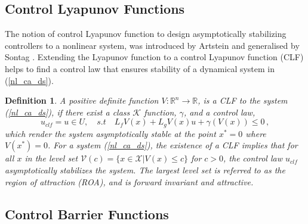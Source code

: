 \documentclass[3p,times,procedia]{elsarticle}
\newtheorem{definition}{Definition}
\begin{document}
\subsection{Control Lyapunov Functions}\label{sec:clf}

The notion of control Lyapunov function \cite{Freeman1996} to design asymptotically stabilizing controllers to a nonlinear system, was introduced by Artstein and generalised by Sontag \cite{Artstein1983, Sontag1989}. Extending the Lyapunov function to a control Lyapunov function (CLF) helps to find a control law that ensures stability of a dynamical system in (\ref{nl_ca_ds}). 

\begin{definition} \label{CLF_definition}
    A positive definite function $V  :  \mathbb{R}^{n} \to \mathbb{R} $, is a CLF to the system (\ref{nl_ca_ds}), if there exist a  class $\mathcal{K}$ function, $\gamma$, and a control law,
     \begin{equation}
        u_{clf} = u \in U, \quad s.t \quad L_{f} V(x)+L_{g} V(x) u + \gamma (V(x)) \leq 0 \, ,
    \end{equation} 
   which render the system asymptotically stable at the point $x^{*} = 0$  where $V(x^{*}) = 0$.
   For a system (\ref{nl_ca_ds}), the existence of a CLF implies that for all $x$ in the level set $\mathcal{V}(c) = \{x \in \mathcal{X} | V(x) \leq c\}$ for $c > 0$, the control law $u_{clf}$ asymptotically stabilizes the system. The largest level set is referred to as the region of attraction (ROA), and is forward invariant and attractive.
\end{definition}

 
\subsection{Control Barrier Functions}\label{sec:cbf}
\end{document}
